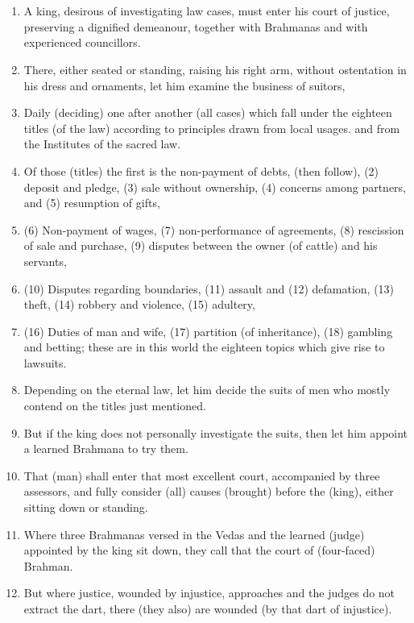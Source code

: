 \chapter{}
\begin{enumerate}
\item A king, desirous of investigating law cases, must enter his court of justice, preserving a dignified demeanour, together with Brahmanas and with experienced councillors.
\item There, either seated or standing, raising his right arm, without ostentation in his dress and ornaments, let him examine the business of suitors,
\item Daily (deciding) one after another (all cases) which fall under the eighteen titles (of the law) according to principles drawn from local usages. and from the Institutes of the sacred law.
\item Of those (titles) the first is the non-payment of debts, (then follow), (2) deposit and pledge, (3) sale without ownership, (4) concerns among partners, and (5) resumption of gifts,
\item (6) Non-payment of wages, (7) non-performance of agreements, (8) rescission of sale and purchase, (9) disputes between the owner (of cattle) and his servants,
\item (10) Disputes regarding boundaries, (11) assault and (12) defamation, (13) theft, (14) robbery and violence, (15) adultery,
\item (16) Duties of man and wife, (17) partition (of inheritance), (18) gambling and betting; these are in this world the eighteen topics which give rise to lawsuits.
\item Depending on the eternal law, let him decide the suits of men who mostly contend on the titles just mentioned.
\item But if the king does not personally investigate the suits, then let him appoint a learned Brahmana to try them.
\item That (man) shall enter that most excellent court, accompanied by three assessors, and fully consider (all) causes (brought) before the (king), either sitting down or standing.
\item Where three Brahmanas versed in the Vedas and the learned (judge) appointed by the king sit down, they call that the court of (four-faced) Brahman.
\item But where justice, wounded by injustice, approaches and the judges do not extract the dart, there (they also) are wounded (by that dart of injustice).

\end{enumerate}

